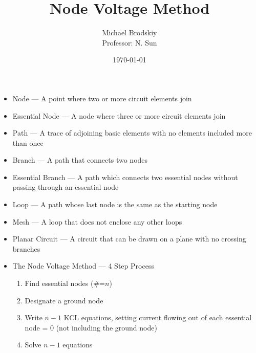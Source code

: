 


\title{Node Voltage Method}
\date{\today}
\author{Michael Brodskiy\\ \small Professor: N. Sun}



\maketitle

\begin{itemize}

  \item Node — A point where two or more circuit elements join

  \item Essential Node — A node where three or more circuit elements join

  \item Path — A trace of adjoining basic elements with no elements included more than once

  \item Branch — A path that connects two nodes

  \item Essential Branch — A path which connects two essential nodes without passing through an essential node

  \item Loop — A path whose last node is the same as the starting node

  \item Mesh — A loop that does not enclose any other loops

  \item Planar Circuit — A circuit that can be drawn on a plane with no crossing branches

  \item The Node Voltage Method — 4 Step Process
    
    \begin{enumerate}

      \item Find essential nodes (\#=$n$)

      \item Designate a ground node

      \item Write $n-1$ KCL equations, setting current flowing out of each essential node = 0 (not including the ground node)

      \item Solve $n-1$ equations

    \end{enumerate}

\end{itemize}



